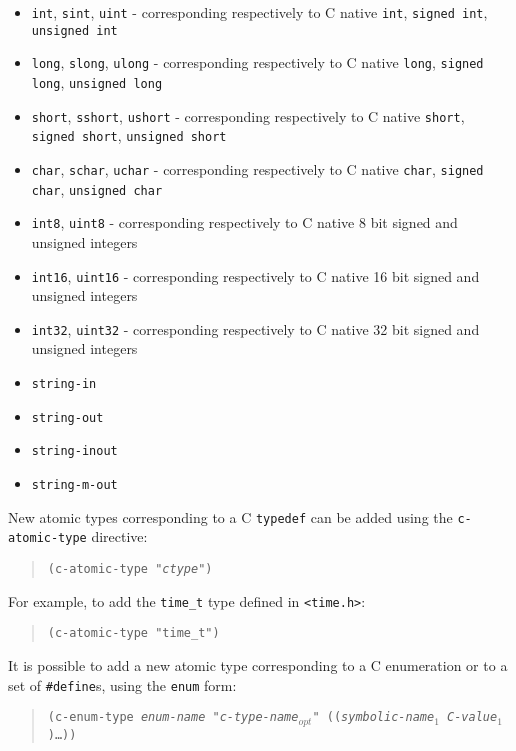 \documentclass[10pt,twocolumn]{article}
\begin{document}
\begin{itemize}
\item \texttt{int}, \texttt{sint}, \texttt{uint} - corresponding
  respectively to C native \texttt{int}, \texttt{signed int},
  \texttt{unsigned int}
\item \texttt{long}, \texttt{slong}, \texttt{ulong} - corresponding
  respectively to C native \texttt{long}, \texttt{signed long},
  \texttt{unsigned long}
\item \texttt{short}, \texttt{sshort}, \texttt{ushort} - corresponding
  respectively to C native \texttt{short}, \texttt{signed short},
  \texttt{unsigned short}
\item \texttt{char}, \texttt{schar}, \texttt{uchar} - corresponding
  respectively to C native \texttt{char}, \texttt{signed char},
  \texttt{unsigned char}
\item \texttt{int8}, \texttt{uint8} - corresponding
  respectively to C native 8 bit signed and unsigned integers
\item \texttt{int16}, \texttt{uint16} - corresponding
  respectively to C native 16 bit signed and unsigned integers
\item \texttt{int32}, \texttt{uint32} - corresponding
  respectively to C native 32 bit signed and unsigned integers

\item \texttt{string-in}
\item \texttt{string-out}
\item \texttt{string-inout}
\item \texttt{string-m-out}
\end{itemize}

New atomic types corresponding to a C \texttt{typedef} can be added
using the \texttt{c-atomic-type} directive:

\begin{quotation}
  \texttt{(c-atomic-type "\textsl{ctype}")}
\end{quotation}

For example, to add the \texttt{time\_t} type defined in
\texttt{<time.h>}:

\begin{quotation}
  \texttt{(c-atomic-type "time\_t")}
\end{quotation}

It is possible to add a new atomic type corresponding to a C
enumeration or to a set of \texttt{\#define}s, using the \texttt{enum}
form:

\begin{quotation}
  \texttt{(c-enum-type \textsl{enum-name} \textsl{"c-type-name$_{opt}$"} ((\textsl{symbolic-name$_1$} \textsl{C-value$_1$})\dots ))}
\end{quotation}
\end{document}
